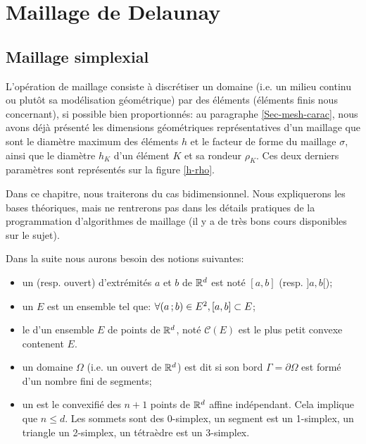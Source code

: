 \medskip
\section{Maillage de Delaunay}\label{Sec-MeshDelau}

\medskip
\subsection{Maillage simplexial}

L'opération de maillage consiste à discrétiser un domaine (i.e. un milieu continu ou plutôt sa modélisation géométrique) par des éléments 
(éléments finis nous concernant), si possible bien proportionnés: 
au paragraphe \ref{Sec-mesh-carac}, nous avons déjà présenté les dimensions géométriques représentatives d'un maillage que sont 
le diamètre maximum des éléments $h$ et le facteur de forme du maillage 
$\sigma$, ainsi que le diamètre $h_K$ d'un élément $K$ et sa rondeur $\rho_K$.
Ces deux derniers paramètres sont représentés sur la figure \ref{h-rho}. 

\medskip
Dans ce chapitre, nous traiterons du cas bidimensionnel.
Nous expliquerons les bases théoriques, mais ne rentrerons pas dans les détails pratiques de la programmation
d'algorithmes de maillage (il y a de très bons cours disponibles sur le sujet).

\medskip
Dans la suite nous aurons besoin des notions suivantes:
\begin{itemize}
   \item un  (resp. ouvert) d'extrémités $a$ et $b$ de $\mathbb R^d$ est noté $[a,b]$ (resp. $]a,b[$);
   \item un  $E$ est un ensemble tel que: $\forall \mathopen{(}a\,;b\mathclose{)}\in E^2, [a,b]\subset E$;
   \item le  d'un ensemble $E$ de points de $\mathbb R^d$, noté $\mathcal{C}(E)$ est le plus petit convexe
	contenent $E$.
   \item un domaine $\Omega$ (i.e. un ouvert de $\mathbb R^d$) est dit  si son bord $\Gamma=\partial\Omega$
	est formé d'un nombre fini de segments;
   \item un  est le convexifié des $n+1$ points de $\mathbb R^d$ affine indépendant.
	Cela implique que $n\le d$. Les sommets sont des 0-simplex, un segment est un 1-simplex, un triangle un 2-simplex, un tétraèdre est un 3-simplex.
\end{itemize}



